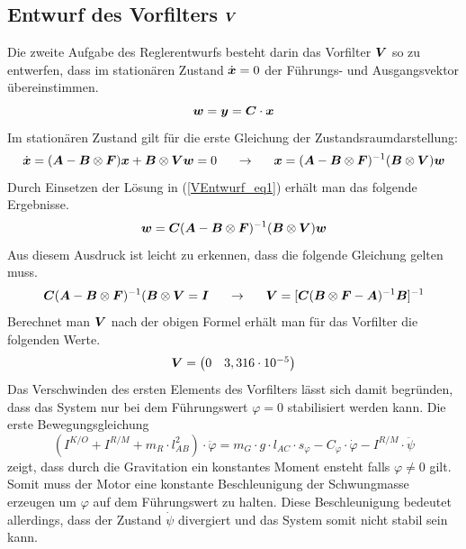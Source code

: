 \subsection{Entwurf des Vorfilters $\boldsymbol{V}$}
Die zweite Aufgabe des Reglerentwurfs besteht darin das Vorfilter $\boldsymbol{V}$ so zu entwerfen, dass im stationären Zustand $\dot{\boldsymbol{x}}=0$ der Führungs- und Ausgangsvektor übereinstimmen.
\begin{equation}
\label{VEntwurf_eq1}
\boldsymbol{w}=\boldsymbol{y}=\boldsymbol{C}\cdot\boldsymbol{x}
\end{equation}
Im stationären Zustand gilt für die erste Gleichung der Zustandsraumdarstellung:
\begin{equation}
\dot{\boldsymbol{x}}= (\boldsymbol{A}-\boldsymbol{B}\otimes\boldsymbol{F})\boldsymbol{x}+\boldsymbol{B}\otimes\boldsymbol{V}\boldsymbol{w}=0 \hspace{15pt}\rightarrow\hspace{15pt} \boldsymbol{x} = (\boldsymbol{A}-\boldsymbol{B}\otimes\boldsymbol{F})^{-1} (\boldsymbol{B}\otimes\boldsymbol{V})\boldsymbol{w}
\end{equation}
Durch Einsetzen der Lösung in (\ref{VEntwurf_eq1}) erhält man das folgende Ergebnisse.
\begin{equation}
\boldsymbol{w}=\boldsymbol{C}(\boldsymbol{A}-\boldsymbol{B}\otimes\boldsymbol{F})^{-1} (\boldsymbol{B}\otimes\boldsymbol{V})\boldsymbol{w}
\end{equation}
Aus diesem Ausdruck ist leicht zu erkennen, dass die folgende Gleichung gelten muss.
\begin{equation}
\boldsymbol{C}(\boldsymbol{A}-\boldsymbol{B}\otimes\boldsymbol{F})^{-1} (\boldsymbol{B}\otimes\boldsymbol{V}=\boldsymbol{I} \hspace{15pt}\rightarrow\hspace{15pt} \boldsymbol{V} = [\boldsymbol{C}(\boldsymbol{B}\otimes\boldsymbol{F}-\boldsymbol{A})^{-1}\boldsymbol{B}]^{-1}
\end{equation}
Berechnet man $\boldsymbol{V}$ nach der obigen Formel erhält man für das Vorfilter die folgenden Werte.
\begin{equation}
\boldsymbol{V} = \begin{pmatrix}
0 & 3,316\cdot 10^{-5}
\end{pmatrix}
\end{equation}
Das Verschwinden des ersten Elements des Vorfilters lässt sich damit begründen, dass das System nur bei dem Führungswert $\varphi=0$ stabilisiert werden kann. Die erste Bewegungsgleichung
\begin{equation}
(I^{K/O}+I^{R/M}+m_R\cdot l_{AB}^2)\cdot \ddot{\varphi} = m_G \cdot g \cdot l_{AC} \cdot s_{\varphi} - C_{\varphi} \cdot \dot{\varphi} - I^{R/M} \cdot \ddot{\psi}
\end{equation}
zeigt, dass durch die Gravitation ein konstantes Moment ensteht falls $\varphi\neq 0$ gilt. Somit muss der Motor eine konstante Beschleunigung der Schwungmasse erzeugen um $\varphi$ auf dem Führungswert zu halten. Diese Beschleunigung bedeutet allerdings, dass der Zustand $\dot{\psi}$ divergiert und das System somit nicht stabil sein kann.

